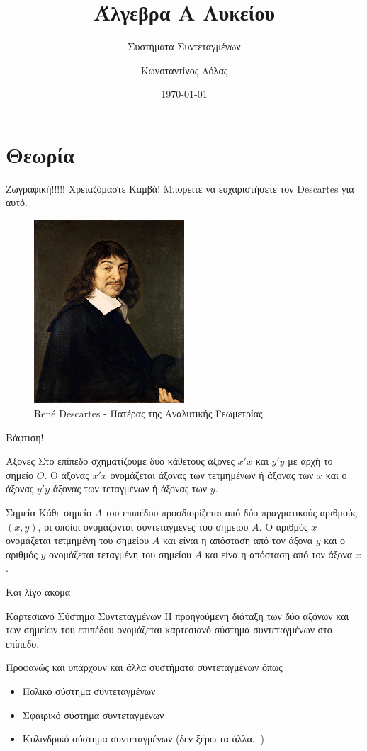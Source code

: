 \documentclass{../../presentation}
\title{Άλγεβρα Α Λυκείου}
\subtitle{Συστήματα Συντεταγμένων}
\author[Λόλας]{Κωνσταντίνος Λόλας}
\date{\today}
\begin{document}
\frame{\titlepage}

\section{Θεωρία}

\begin{frame}{Ζωγραφική!!!!!}
  Χρειαζόμαστε Καμβά! Μπορείτε να ευχαριστήσετε τον Descartes για αυτό.
  \begin{figure}
    \centering
    \includegraphics[width=0.5\textwidth]{images/Descartes}
    \caption{René Descartes - Πατέρας της Αναλυτικής Γεωμετρίας}
  \end{figure}
\end{frame}

\begin{frame}{Βάφτιση!}
  \begin{block}{Άξονες}
    Στο επίπεδο σχηματίζουμε δύο κάθετους άξονες $x'x$ και $y'y$ με αρχή το σημείο $O$. Ο άξονας $x'x$ ονομάζεται άξονας των τετμημένων ή άξονας των $x$ και ο άξονας $y'y$ άξονας των τεταγμένων ή άξονας των $y$.
  \end{block}
  \begin{block}{Σημεία}
    Κάθε σημείο $A$ του επιπέδου προσδιορίζεται από δύο πραγματικούς αριθμούς $(x,y)$, οι οποίοι ονομάζονται συντεταγμένες του σημείου $A$. Ο αριθμός $x$ ονομάζεται τετμημένη του σημείου $A$ και είναι η απόσταση από τον άξονα $y$ και ο αριθμός $y$ ονομάζεται τεταγμένη του σημείου $A$ και είνα η απόσταση από τον άξονα $x$.
  \end{block}
\end{frame}

\begin{frame}{Και λίγο ακόμα}
  \begin{block}{Καρτεσιανό Σύστημα Συντεταγμένων}
    Η προηγούμενη διάταξη των δύο αξόνων και των σημείων του επιπέδου ονομάζεται καρτεσιανό σύστημα συντεταγμένων στο επίπεδο.
  \end{block}
  Προφανώς και υπάρχουν και άλλα συστήματα συντεταγμένων όπως
  \begin{itemize}
    \item Πολικό σύστημα συντεταγμένων
    \item Σφαιρικό σύστημα συντεταγμένων
    \item Κυλινδρικό σύστημα συντεταγμένων (δεν ξέρω τα άλλα...)
  \end{itemize}
\end{frame}
\end{document}
